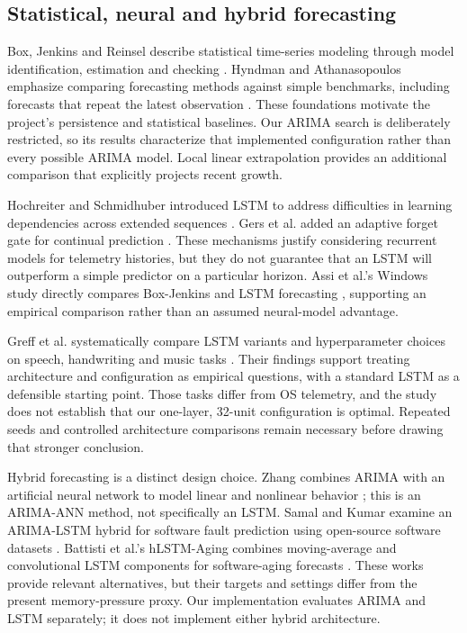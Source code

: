 \documentclass[10pt,a4paper,twocolumn]{article}
\begin{document}
\subsection{Statistical, neural and hybrid forecasting}

Box, Jenkins and Reinsel describe statistical time-series modeling through model identification, estimation and checking \cite{ref24}. Hyndman and Athanasopoulos emphasize comparing forecasting methods against simple benchmarks, including forecasts that repeat the latest observation \cite{ref25}. These foundations motivate the project's persistence and statistical baselines. Our ARIMA search is deliberately restricted, so its results characterize that implemented configuration rather than every possible ARIMA model. Local linear extrapolation provides an additional comparison that explicitly projects recent growth.

Hochreiter and Schmidhuber introduced LSTM to address difficulties in learning dependencies across extended sequences \cite{ref26}. Gers et al. added an adaptive forget gate for continual prediction \cite{ref27}. These mechanisms justify considering recurrent models for telemetry histories, but they do not guarantee that an LSTM will outperform a simple predictor on a particular horizon. Assi et al.'s Windows study directly compares Box-Jenkins and LSTM forecasting \cite{ref2}, supporting an empirical comparison rather than an assumed neural-model advantage.

Greff et al. systematically compare LSTM variants and hyperparameter choices on speech, handwriting and music tasks \cite{ref28}. Their findings support treating architecture and configuration as empirical questions, with a standard LSTM as a defensible starting point. Those tasks differ from OS telemetry, and the study does not establish that our one-layer, 32-unit configuration is optimal. Repeated seeds and controlled architecture comparisons remain necessary before drawing that stronger conclusion.

Hybrid forecasting is a distinct design choice. Zhang combines ARIMA with an artificial neural network to model linear and nonlinear behavior \cite{ref29}; this is an ARIMA-ANN method, not specifically an LSTM. Samal and Kumar examine an ARIMA-LSTM hybrid for software fault prediction using open-source software datasets \cite{ref30}. Battisti et al.'s hLSTM-Aging combines moving-average and convolutional LSTM components for software-aging forecasts \cite{ref31}. These works provide relevant alternatives, but their targets and settings differ from the present memory-pressure proxy. Our implementation evaluates ARIMA and LSTM separately; it does not implement either hybrid architecture.
\end{document}
